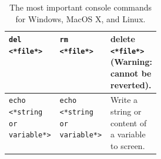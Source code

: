 \begin{table}
\begin{tabular}{|l|l||p{0.3\linewidth}|}
    {\lstinline[language=syntax]|del <*file*>|}
            & {\lstinline[language=syntax]|rm <*file*>|}
                          & delete {\lstinline[language=syntax]|<*file*>|} (Warning: cannot be reverted). \\ \hline
    {\lstinline[language=syntax, keywords={}]|echo <*string or variable*>|\hspace*{5mm}}
            & {\lstinline[language=syntax, keywords={}]|echo <*string or variable*>|\hspace*{5mm}}
                          & Write a string or content of a variable to screen. \\ \hline
  \end{tabular}\\
  \caption{The most important console commands for Windows, MacOS X, and Linux.}
  \label{tab:Kommandoer}
\end{table}


